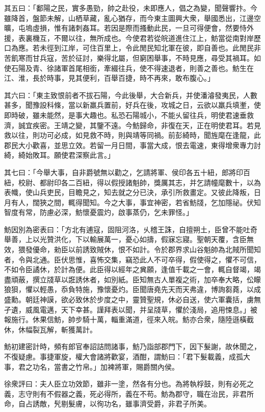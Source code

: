 \begin{pinyinscope}
其五曰：「鄱陽之民，實多愚勁，帥之赴役，未即應人，倡之為變，聞聲響抃。今雖降首，盤節未解，山栖草藏，亂心猶存，而今東主圖興大衆，舉國悉出，江邊空曠，屯塢虛損，惟有諸刺姦耳。若因是際而搔動此民，一旦可得便會，然要恃外援，表裏機互，不爾以往，無所成也。今使君若從皖道進住江上，魴當從南對岸歷口為應。若未徑到江岸，可住百里上，令此閒民知北軍在彼，即自善也。此閒民非苦飢寒而甘兵寇，苦於征討，樂得北屬，但窮困舉事，不時見應，尋受其禍耳。如使石陽及青、徐諸軍首尾相銜，牽綴往兵，使不得速退者，則善之善也。魴生在江、淮，長於時事，見其便利，百舉百捷，時不再來，敢布腹心。」

其六曰：「東主致恨前者不拔石陽，今此後舉，大合新兵，并使潘濬發夷民，人數甚多，聞豫設科條，當以新羸兵置前，好兵在後，攻城之日，云欲以羸兵填壍，使即時破，雖未能然，是事大趣也。私恐石陽城小，不能乆留往兵，明使君速垂救濟，誠宜疾密。王靖之變，其鑒不遠。今魴歸命，非復在天，正在明使君耳。若見救以往，則功可必成，如見救不時，則與靖等同禍。前彭綺時，聞旌麾在逢龍，此郡民大小歡喜，並思立效。若留一月日間，事當大成，恨去電速，東得增衆專力討綺，綺始敗耳。願使君深察此言。」

其七曰：「今舉大事，自非爵號無以勸之，乞請將軍、侯印各五十紐，郎將印百紐，校尉、都尉印各二百紐，得以假授諸魁帥，獎厲其志，并乞請幢麾數十，以為表幟，使山兵吏民，目瞻見之，知去就之分已決，承引所救畫定。又彼此降叛，日月有人，闊狹之間，輒得聞知。今之大事，事宜神密，若省魴牋，乞加隱祕。伏知智度有常，防慮必深，魴懷憂震灼，啟事蒸仍，乞未罪怪。」

魴因別為密表曰：「方北有逋寇，固阻河洛，乆稽王誅，自擅朔土，臣曾不能吐奇舉善，上以光贊洪化，下以輸展萬一，憂心如擣，假寐忘寢。聖朝天覆，含臣無效，猥發優命，勑臣以前誘致賊休，恨不如計。令於郡界求山谷魁帥為北賊所聞知者，令與北通。臣伏思惟，喜怖交集，竊恐此人不可卒得，假使得之，懼不可信，不如令臣譎休，於計為便。此臣得以經年之兾願，逢值千載之一會，輒自督竭，竭盡頑蔽，撰立牋草以誑誘休者，如別紙。臣知無古人單複之術，加卒奉大略，伀矇狼狽，懼以輕愚，忝負特施，豫懷憂灼。臣聞唐堯先天而天弗違，博詢芻蕘，以成盛勳。朝廷神謨，欲必致休於步度之中，靈贊聖規，休必自送，使六軍囊括，虜無孑遺，威風電邁，天下幸甚。謹拜表以聞，并呈牋草，懼於淺局，追用悚息。」被報施行。休果信魴，帥步騎十萬，輜重滿道，徑來入皖。魴亦合衆，隨陸遜橫截休，休幅裂瓦解，斬獲萬計。

魴初建密計時，頻有郎官奉詔詰問諸事，魴乃詣部郡門下，因下髮謝，故休聞之，不復疑慮。事捷軍旋，權大會諸將歡宴，酒酣，謂魴曰：「君下髮載義，成孤大事，君之功名，當書之竹帛。」加裨將軍，賜爵關內侯。

徐衆評曰：夫人臣立功效節，雖非一塗，然各有分也。為將執桴鼓，則有必死之義，志守則有不假器之義，死必得所，義在不苟。魴為郡守，職在治民，非君所命，自占誘敵，髠剔髮膚，以徇功名，雖事濟受爵，非君子所美。


\end{pinyinscope}
